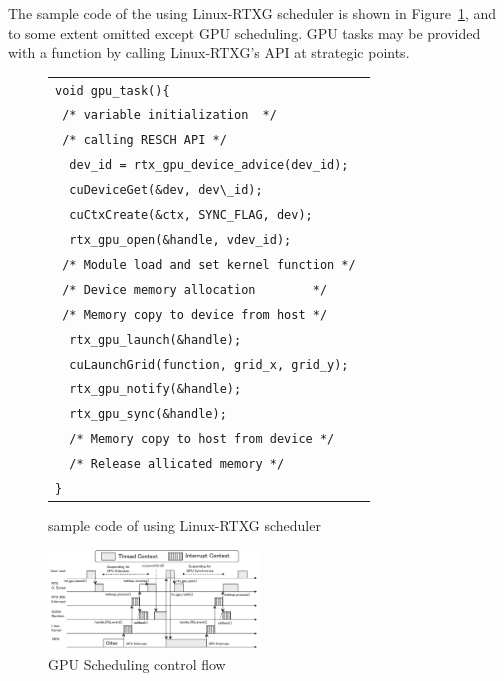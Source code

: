The sample code of the using Linux-RTXG scheduler is shown in Figure~\ref{fig:sample},
and to some extent omitted except GPU scheduling.
GPU tasks may be provided with a function by calling Linux-RTXG's API at strategic points.

\begin{figure}[t]
\begin{center}
\begin{tabular}{l}
\hline\hline
{\scriptsize \verb|void gpu_task(){        |}\\
{\scriptsize \verb| /* variable initialization  */        |}\\
{\scriptsize \verb| /* calling RESCH API */        |}\\
{\scriptsize \verb|  dev_id = rtx_gpu_device_advice(dev_id); |}\\
{\scriptsize \verb|  cuDeviceGet(&dev, dev\_id);           |}\\
{\scriptsize \verb|  cuCtxCreate(&ctx, SYNC_FLAG, dev);    |}\\
{\scriptsize \verb|  rtx_gpu_open(&handle, vdev_id);     |}\\
{\scriptsize \verb| /* Module load and set kernel function */ |}\\
{\scriptsize \verb| /* Device memory allocation        */ |}\\
{\scriptsize \verb| /* Memory copy to device from host */ |}\\
{\scriptsize \verb|  rtx_gpu_launch(&handle); |}\\
{\scriptsize \verb|  cuLaunchGrid(function, grid_x, grid_y); |}\\
{\scriptsize \verb|  rtx_gpu_notify(&handle); |}\\
{\scriptsize \verb|  rtx_gpu_sync(&handle);   |}\\
{\scriptsize \verb|  /* Memory copy to host from device */  |}\\
{\scriptsize \verb|  /* Release allicated memory */  |}\\
{\scriptsize \verb|}|}\\
\hline\hline
\end{tabular}
\caption{sample code of using Linux-RTXG scheduler}
\label{fig:sample}
\end{center}
\end{figure}

\begin{figure}[t]
\begin{center}
\includegraphics[width=0.5\textwidth]{img/gsched_controlflow.pdf}
\caption{GPU Scheduling control flow}
\end{center}
\label{fig:controlflow}
\end{figure}


